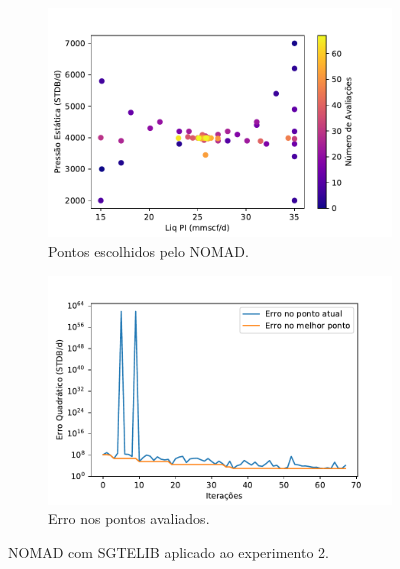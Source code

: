\begin{figure}[H]
\centering
\begin{subfigure}{0.5\textwidth}
  \centering
  \includegraphics[width=1\linewidth]{figs/setup2_sg_points.pdf}
  \caption{Pontos escolhidos pelo NOMAD.}
  \label{fig:exp2_sg_points}
\end{subfigure}%
\begin{subfigure}{0.5\textwidth}
  \centering
  \includegraphics[width=1\linewidth]{figs/setup2noisy_sg_errors.pdf}
  \caption{Erro nos pontos avaliados.}
  \label{fig:exp2_sg_error}
\end{subfigure}
\caption{NOMAD com SGTELIB aplicado ao experimento 2.}
\label{fig:exp2_sg}
\end{figure}





